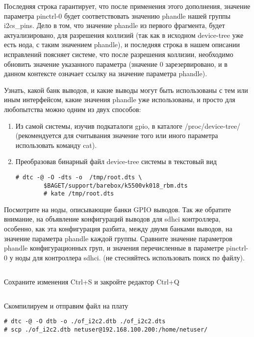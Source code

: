 Последняя строка гарантирует, что после применения этого дополнения, значение параметра pinctrl-0 будет соответствовать значению phandle нашей группы i2cs\_pins. Дело в том, что значение phandle из первого фрагмента, будет  актуализировано, для разрешения коллизий (так как в исходном device-tree уже есть нода, с таким значением phandle), и последняя строка в нашем описании исправлений поясняет системе, что после разрешения коллизии, необходимо обновить значение указанного параметра (значение 0 зарезервировано, и в данном контексте означает ссылку на значение параметра phandle).  

Узнать, какой банк выводов, и какие выводы могут быть использованы с тем или иным интерфейсом, какие значения phandle уже использованы, и просто для любопытства можно одним из двух способов:

\begin{enumerate}
	\item Из самой системы, изучив подкаталоги gpio, в каталоге /proc/device-tree/ (рекомендуется для считывания значение того или иного параметра использовать команду cat). 
	
	\item Преобразовав бинарный файл device-tree системы в текстовый вид 
	\begin{lstlisting}[style=bash]
		# dtc -@ -O -dts -o  /tmp/root.dts \
		$BAGET/support/barebox/k5500vk018_rbm.dts
		# kate /tmp/root.dts
	\end{lstlisting}
\end{enumerate}

Посмотрите на ноды, описывающие банки GPIO выводов. Так же обратите внимание, на объявление конфигураций выводов для sdhci контроллера, особенно, как эта конфигурация разбита, между двумя банками выводов, на значение параметра phandle каждой группы. Сравните значение параметров phandle конфигурационных груп, и значения перечисленные в параметре pinctrl-0 у ноды для контроллера  sdhci. (не стесняйтесь использовать поиск по файлу).

\subsection{}Сохраните изменения Ctrl+S и закройте редактор Ctrl+Q 

\subsection{}Скомпилируем и отправим файл на плату
\begin{lstlisting}[style=bash]
# dtc -@ -O dtb -o ./of_i2c2.dtb ./of_i2c2.dts
# scp ./of_i2c2.dtb netuser@192.168.100.200:/home/netuser/
\end{lstlisting}

